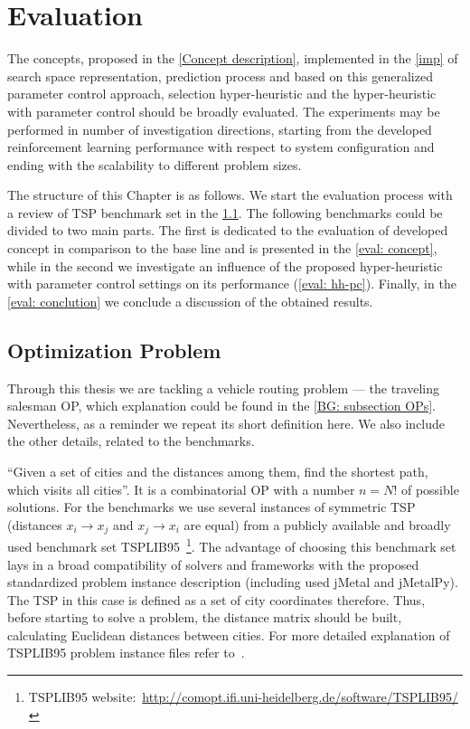 \chapter{Evaluation}\label{eval}
The concepts, proposed in the \cref{Concept description}, implemented in the \cref{imp} of search space representation, prediction process and based on this generalized parameter control approach, selection hyper-heuristic and the hyper-heuristic with parameter control should be broadly evaluated. The experiments may be performed in number of investigation directions, starting from the developed reinforcement learning performance with respect to system configuration and ending with the scalability to different problem sizes.

The structure of this Chapter is as follows. We start the evaluation process with a review of TSP benchmark set in the \cref{eval: op}. The following benchmarks could be divided to two main parts. The first is dedicated to the evaluation of developed concept in comparison to the base line and is presented in the \cref{eval: concept}, while in the second we investigate an influence of the proposed hyper-heuristic with parameter control settings on its performance (\cref{eval: hh-pc}). Finally, in the \cref{eval: conclution} we conclude a discussion of the obtained results.


\section{Optimization Problem}\label{eval: op}
Through this thesis we are tackling a vehicle routing problem — the traveling salesman OP, which explanation could be found in the \cref{BG: subsection OPs}. Nevertheless, as a reminder we repeat its short definition here. We also include the other details, related to the benchmarks.

``Given a set of cities and the distances among them, find the shortest path, which visits all cities''. It is a combinatorial OP with a number $n = N!$ of possible solutions. For the benchmarks we use several instances of symmetric TSP (distances $x_i \rightarrow x_j$ and $x_j \rightarrow x_i$ are equal) from a publicly available and broadly used benchmark set TSPLIB95~\footnote{TSPLIB95 website:~\url{http://comopt.ifi.uni-heidelberg.de/software/TSPLIB95/}}. The advantage of choosing this benchmark set lays in a broad compatibility of solvers and frameworks with the proposed standardized problem instance description (including used jMetal and jMetalPy). The TSP in this case is defined as a set of city coordinates therefore. Thus, before starting to solve a problem, the distance matrix should be built, calculating Euclidean distances between cities. For more detailed explanation of TSPLIB95 problem instance files refer to~\cite{reinelt1995tsplib95}.

